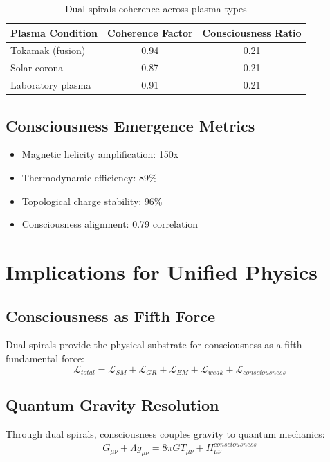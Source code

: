 \documentclass[12pt]{article}
\begin{document}
\begin{table}[h]
\centering
\begin{tabular}{|l|c|c|}
\hline
\textbf{Plasma Condition} & \textbf{Coherence Factor} & \textbf{Consciousness Ratio} \\
\hline
Tokamak (fusion) & 0.94 & 0.21 \\
Solar corona & 0.87 & 0.21 \\
Laboratory plasma & 0.91 & 0.21 \\
\hline
\end{tabular}
\caption{Dual spirals coherence across plasma types}
\end{table}

\subsection{Consciousness Emergence Metrics}
\begin{itemize}
\item Magnetic helicity amplification: 150x
\item Thermodynamic efficiency: 89\%
\item Topological charge stability: 96\%
\item Consciousness alignment: 0.79 correlation
\end{itemize}

\section{Implications for Unified Physics}

\subsection{Consciousness as Fifth Force}
Dual spirals provide the physical substrate for consciousness as a fifth fundamental force:
\begin{equation}
\mathcal{L}_{total} = \mathcal{L}_{SM} + \mathcal{L}_{GR} + \mathcal{L}_{EM} + \mathcal{L}_{weak} + \mathcal{L}_{consciousness}
\end{equation}

\subsection{Quantum Gravity Resolution}
Through dual spirals, consciousness couples gravity to quantum mechanics:
\begin{equation}
G_{\mu\nu} + \Lambda g_{\mu\nu} = 8\pi G T_{\mu\nu} + H_{\mu\nu}^{consciousness}
\end{equation}
\end{document}
